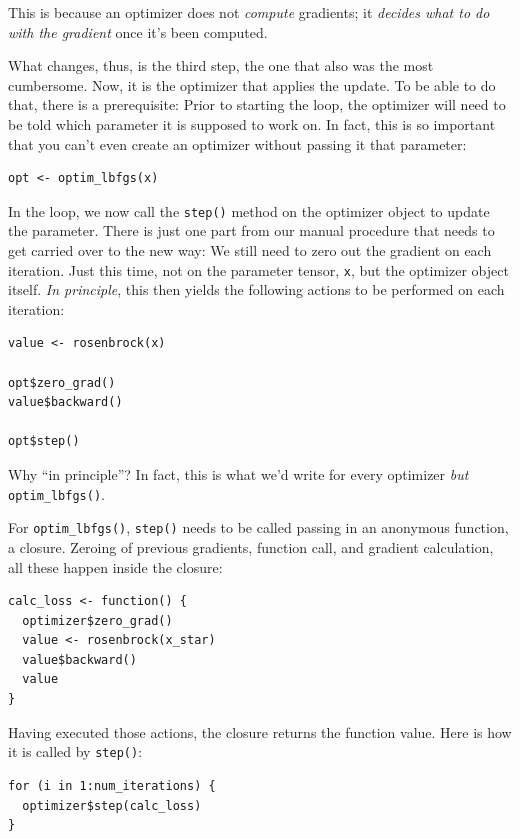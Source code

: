 \documentclass[
  letterpaper,
]{krantz}
\begin{document}
This is because an optimizer does not \emph{compute} gradients; it
\emph{decides what to do with the gradient} once it's been computed.

What changes, thus, is the third step, the one that also was the most
cumbersome. Now, it is the optimizer that applies the update. To be able
to do that, there is a prerequisite: Prior to starting the loop, the
optimizer will need to be told which parameter it is supposed to work
on. In fact, this is so important that you can't even create an
optimizer without passing it that parameter:

\begin{verbatim}
opt <- optim_lbfgs(x)
\end{verbatim}

In the loop, we now call the \texttt{step()} method on the optimizer
object to update the parameter. There is just one part from our manual
procedure that needs to get carried over to the new way: We still need
to zero out the gradient on each iteration. Just this time, not on the
parameter tensor, \texttt{x}, but the optimizer object itself. \emph{In
principle}, this then yields the following actions to be performed on
each iteration:

\begin{verbatim}
value <- rosenbrock(x)

opt$zero_grad()
value$backward()

opt$step()
\end{verbatim}

Why ``in principle''? In fact, this is what we'd write for every
optimizer \emph{but} \texttt{optim\_lbfgs()}.

For \texttt{optim\_lbfgs()}, \texttt{step()} needs to be called passing
in an anonymous function, a closure. Zeroing of previous gradients,
function call, and gradient calculation, all these happen inside the
closure:

\begin{verbatim}
calc_loss <- function() {
  optimizer$zero_grad()
  value <- rosenbrock(x_star)
  value$backward()
  value
}
\end{verbatim}

Having executed those actions, the closure returns the function value.
Here is how it is called by \texttt{step()}:

\begin{verbatim}
for (i in 1:num_iterations) {
  optimizer$step(calc_loss)
}
\end{verbatim}
\end{document}
